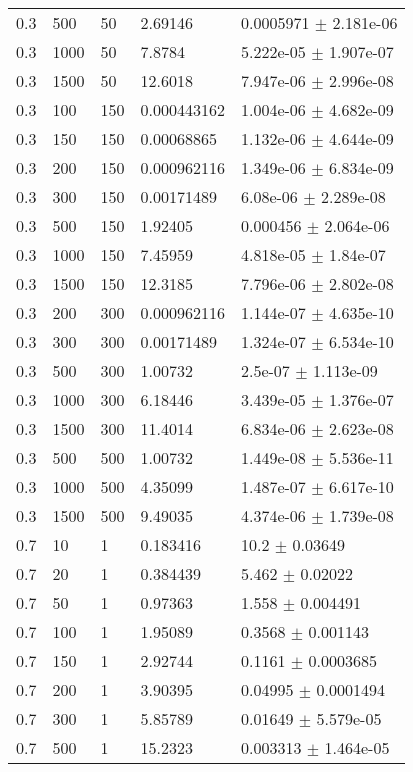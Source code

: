 \begin{longtable}{lllll}
 0.3 &   500 &    50 &  2.69146 & 0.0005971 $\pm$ 2.181e-06 \\
 0.3 &  1000 &    50 &   7.8784 & 5.222e-05 $\pm$ 1.907e-07 \\
 0.3 &  1500 &    50 &  12.6018 & 7.947e-06 $\pm$ 2.996e-08 \\
 0.3 &   100 &   150 & 0.000443162 & 1.004e-06 $\pm$ 4.682e-09 \\
 0.3 &   150 &   150 & 0.00068865 & 1.132e-06 $\pm$ 4.644e-09 \\
 0.3 &   200 &   150 & 0.000962116 & 1.349e-06 $\pm$ 6.834e-09 \\
 0.3 &   300 &   150 & 0.00171489 & 6.08e-06 $\pm$ 2.289e-08 \\
 0.3 &   500 &   150 &  1.92405 & 0.000456 $\pm$ 2.064e-06 \\
 0.3 &  1000 &   150 &  7.45959 & 4.818e-05 $\pm$ 1.84e-07 \\
 0.3 &  1500 &   150 &  12.3185 & 7.796e-06 $\pm$ 2.802e-08 \\
 0.3 &   200 &   300 & 0.000962116 & 1.144e-07 $\pm$ 4.635e-10 \\
 0.3 &   300 &   300 & 0.00171489 & 1.324e-07 $\pm$ 6.534e-10 \\
 0.3 &   500 &   300 &  1.00732 &  2.5e-07 $\pm$ 1.113e-09 \\
 0.3 &  1000 &   300 &  6.18446 & 3.439e-05 $\pm$ 1.376e-07 \\
 0.3 &  1500 &   300 &  11.4014 & 6.834e-06 $\pm$ 2.623e-08 \\
 0.3 &   500 &   500 &  1.00732 & 1.449e-08 $\pm$ 5.536e-11 \\
 0.3 &  1000 &   500 &  4.35099 & 1.487e-07 $\pm$ 6.617e-10 \\
 0.3 &  1500 &   500 &  9.49035 & 4.374e-06 $\pm$ 1.739e-08 \\
 0.7 &    10 &     1 & 0.183416 &     10.2 $\pm$  0.03649 \\
 0.7 &    20 &     1 & 0.384439 &    5.462 $\pm$  0.02022 \\
 0.7 &    50 &     1 &  0.97363 &    1.558 $\pm$ 0.004491 \\
 0.7 &   100 &     1 &  1.95089 &   0.3568 $\pm$ 0.001143 \\
 0.7 &   150 &     1 &  2.92744 &   0.1161 $\pm$ 0.0003685 \\
 0.7 &   200 &     1 &  3.90395 &  0.04995 $\pm$ 0.0001494 \\
 0.7 &   300 &     1 &  5.85789 &  0.01649 $\pm$ 5.579e-05 \\
 0.7 &   500 &     1 &  15.2323 & 0.003313 $\pm$ 1.464e-05 \\

\end{longtable}

